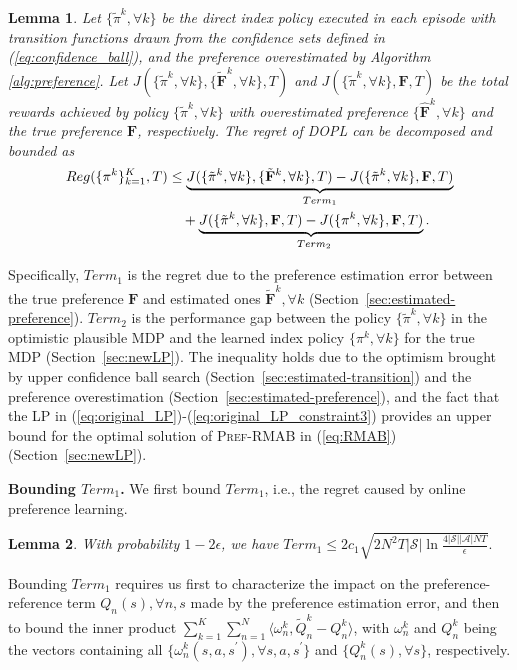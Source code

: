 \documentclass{article} %
\def\eqref#1{equation~\ref{#1}}
\newcommand{\RMABPF}{\textsc{Pref-RMAB}\xspace}
\newcommand{\DOPL}{\textsc{DOPL}\xspace}
\newcommand{\bF}{\mathbf{F}}
\newcommand{\cA}{\mathcal{A}}
\newcommand{\cS}{\mathcal{S}}
\newtheorem{lemma}{Lemma}
\renewcommand{\eqref}[1]{(\ref{#1})}
\begin{document}
\begin{lemma}\label{lemma:regret_decomp}
Let $\{\tilde{\pi}^k, \forall k\}$ be the direct index policy executed in each episode with transition functions drawn from the confidence sets defined in \eqref{eq:confidence_ball}, and the preference overestimated by Algorithm \ref{alg:preference}. 
Let $J(\{\tilde{\pi}^k, \forall k\}, \{\tilde{\bF}^k, \forall  k\}, T)$ and  $J( \{\tilde{\pi}^k, \forall k\}, \bF, T)$ be the total rewards achieved by policy $\{\tilde{\pi}^k, \forall k\}$ with overestimated preference $\{\hat{\bF}^k, \forall k\}$ and the true preference $\bF$, respectively.
The regret of \DOPL can be decomposed and bounded as
\begin{align}\label{eq:lemma2}
    Reg(\{\pi^k\}_{k=1}^K, T) &\leq \underset{Term_1}{\underbrace{J(  \{\tilde{\pi}^k, \forall k\}, \{\tilde{\bF}^k, \forall k\}, T)-J(\{\tilde{\pi}^k, \forall k\}, \bF, T)}}\nonumber\allowdisplaybreaks\\
    &\quad+\underset{Term_2}{\underbrace{J( \{\tilde{\pi}^k, \forall k\}, \bF, T)-J(\{\pi^{k}, \forall k\}, \bF, T)}. }\allowdisplaybreaks
\end{align}
\end{lemma}
Specifically, $Term_1$ is the regret due to the preference estimation error between the true preference $\bF$ and estimated ones $\tilde{\bF}^k, \forall k$ (Section~\ref{sec:estimated-preference}). $Term_2$ is the performance gap between the policy $\{\tilde{\pi}^k, \forall k\}$ in the optimistic plausible MDP and the learned index policy $\{\pi^k, \forall k\}$ for the true MDP (Section~\ref{sec:newLP}). 
The inequality holds due to the optimism brought by upper confidence ball search (Section~\ref{sec:estimated-transition}) and the preference overestimation (Section~\ref{sec:estimated-preference}), and the fact that the LP in \eqref{eq:original_LP}-\eqref{eq:original_LP_constraint3} provides an upper bound for the optimal solution of \RMABPF in \eqref{eq:RMAB} (Section~\ref{sec:newLP}). 






\textbf{Bounding $Term_1$.} We first bound $Term_1$, i.e., the regret caused by online preference learning. 
\begin{lemma}\label{lem:term1}
With probability $1-2\epsilon$, we have $Term_1\leq 2c_1\sqrt{2N^2T|\cS|\ln\frac{4|\cS||\cA|NT}{\epsilon}}.$ 
\end{lemma}
Bounding $Term_1$ requires us first to characterize the impact on the preference-reference term $Q_n(s), \forall n, s$ made by the preference estimation error, and then to bound the inner product
$\sum_{k=1}^K\sum_{n=1}^N\langle  \omega_n^k, \tilde{Q}_n^k-Q_n^k \rangle$, with $\omega_n^k$ and $Q_n^k$ being the vectors containing all $\{\omega_n^k(s,a,s^\prime), \forall s, a, s^\prime\}$ and $\{Q_n^k(s), \forall s\}$, respectively.
\end{document}

